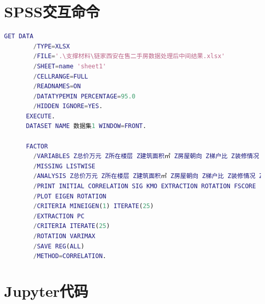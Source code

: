 \documentclass[withoutpreface,bwprint]{cumcmthesis} %
\begin{document}
\begin{appendices}
    \section{SPSS交互命令}

    \begin{lstlisting}[language=MATLAB]
        GET DATA 
        /TYPE=XLSX 
        /FILE='.\支撑材料\链家西安在售二手房数据处理后中间结果.xlsx' 
        /SHEET=name 'sheet1' 
        /CELLRANGE=FULL 
        /READNAMES=ON 
        /DATATYPEMIN PERCENTAGE=95.0 
        /HIDDEN IGNORE=YES. 
      EXECUTE. 
      DATASET NAME 数据集1 WINDOW=FRONT.
      
      FACTOR 
        /VARIABLES Z总价万元 Z所在楼层 Z建筑面积㎡ Z房屋朝向 Z梯户比 Z装修情况 Z供暖方式 Z是否有抵押
        /MISSING LISTWISE 
        /ANALYSIS Z总价万元 Z所在楼层 Z建筑面积㎡ Z房屋朝向 Z梯户比 Z装修情况 Z供暖方式 Z是否有抵押
        /PRINT INITIAL CORRELATION SIG KMO EXTRACTION ROTATION FSCORE 
        /PLOT EIGEN ROTATION 
        /CRITERIA MINEIGEN(1) ITERATE(25) 
        /EXTRACTION PC 
        /CRITERIA ITERATE(25) 
        /ROTATION VARIMAX 
        /SAVE REG(ALL) 
        /METHOD=CORRELATION. 
    \end{lstlisting}

    \section{Jupyter代码}


\end{appendices}
\end{document}

